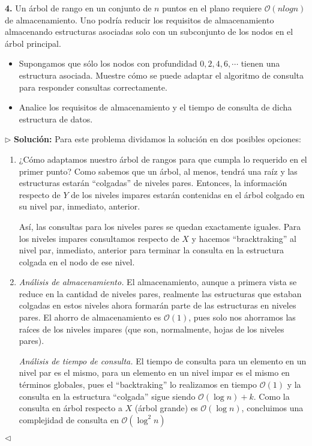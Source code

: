 \textbf{4.} Un árbol de rango en un conjunto de $n$ puntos en el plano requiere
$\mathcal{O}(n log n)$ de almacenamiento. Uno podría reducir los requisitos de
almacenamiento almacenando estructuras asociadas solo con un subconjunto de los
nodos en el árbol principal.

\begin{itemize}
\item Supongamos que sólo los nodos con profundidad $0, 2, 4, 6, \dotsm$ tienen
  una estructura asociada. Muestre cómo se puede adaptar el algoritmo de consulta
  para responder consultas correctamente.
\item Analice los requisitos de almacenamiento y el tiempo de consulta de dicha
  estructura de datos.
\end{itemize}

$\rhd$ \textbf{Solución:} Para este problema dividamos la solución en dos posibles
opciones:
\begin{enumerate}
\item ¿Cómo adaptamos nuestro árbol de rangos para que cumpla lo requerido en el primer
  punto? Como sabemos que un árbol, al menos, tendrá una raíz y las estructuras estarán
  ``colgadas'' de niveles pares. Entonces, la información respecto de $Y$ de los niveles
  impares estarán contenidas en el árbol colgado en su nivel par, inmediato, anterior.
  \newline
  
  Así, las consultas para los niveles pares se quedan exactamente iguales. Para los niveles
  impares consultamos respecto de $X$ y hacemos ``bracktraking'' al nivel par, inmediato,
  anterior para terminar la consulta en la estructura colgada en el nodo de ese nivel.
\item \textit{Análisis de almacenamiento.} El almacenamiento, aunque a primera vista se reduce
  en la cantidad de niveles pares, realmente las estructuras que estaban colgadas en estos niveles
  ahora formarán parte de las estructuras en niveles pares. El ahorro de almacenamiento es $\mathcal{O}(1)$,
  pues solo nos ahorramos las raíces de los niveles impares (que son, normalmente, hojas de los niveles
  pares).\newline
  
  \textit{Análisis de tiempo de consulta.} El tiempo de consulta para un elemento en un nivel par es el mismo,
  para un elemento en un nivel impar es el mismo en términos globales, pues el ``backtraking'' lo realizamos
  en tiempo $\mathcal{O}(1)$ y la consulta en la estructura ``colgada'' sigue siendo $\mathcal{O}(\log n) + k$.
  Como la consulta en árbol respecto a $X$ (árbol grande) es $\mathcal{O}(\log n)$, concluimos una
  complejidad de consulta en $\mathcal{O}(\log^2 n)$
\end{enumerate}

\hfill $\lhd$
